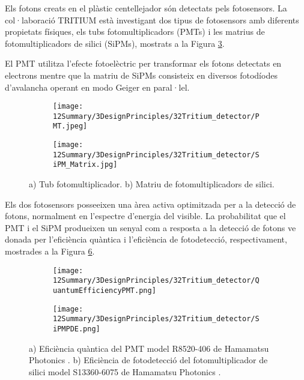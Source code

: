 Els fotons creats en el plàstic centellejador són detectats pels fotosensors. La col·laboració TRITIUM està investigant dos tipus de fotosensors amb diferents propietats físiques, els tubs fotomultiplicadors (PMTs) i les matrius de fotomultiplicadors de silici (SiPMs), mostrats a la Figura \ref{fig:Fotosensors}.

El PMT utilitza l'efecte fotoelèctric per transformar els fotons detectats en electrons mentre que la matriu de SiPMs consisteix en diversos fotodíodes d'avalancha operant en modo Geiger en paral·lel.

\begin{figure}[htpb]
\centering
    \begin{subfigure}[b]{0.4\textwidth}
    \centering
    \texttt{[image: 12Summary/3DesignPrinciples/32Tritium\_detector/PMT.jpeg]}  
    \caption{\label{subfig:PMT}}
    \end{subfigure}
    \hfill
    \begin{subfigure}[b]{0.4\textwidth}
    \centering
    \texttt{[image: 12Summary/3DesignPrinciples/32Tritium\_detector/SiPM\_Matrix.jpg]}  
    \caption{\label{subfig:SiPM}}
    \end{subfigure}
 \caption{a) Tub fotomultiplicador. b) Matriu de fotomultiplicadors de silici.}
 \label{fig:Fotosensors}
\end{figure}

Els dos fotosensors posseeixen una àrea activa optimitzada per a la detecció de fotons, normalment en l'espectre d'energia del visible. La probabilitat que el PMT i el SiPM produeixen un senyal com a resposta a la detecció de fotons ve donada per l'eficiència quàntica i l'eficiència de fotodetecció, respectivament, mostrades a la Figura \ref{fig:EficienciaFotosensors}. 

\begin{figure}[htpb]
\centering
    \begin{subfigure}[b]{0.75\textwidth}
    \centering
    \texttt{[image: 12Summary/3DesignPrinciples/32Tritium\_detector/QuantumEfficiencyPMT.png]}  
    \caption{\label{subfig:QEPMT}}
    \end{subfigure}
    \hfill
    \begin{subfigure}[b]{0.75\textwidth}
    \centering
    \texttt{[image: 12Summary/3DesignPrinciples/32Tritium\_detector/SiPMPDE.png]}  
    \caption{\label{subfig:PDESiPM}}
    \end{subfigure}
 \caption{a) Eficiència quàntica del PMT model R8520-406 de Hamamatsu Photonics \cite{DataSheetPMTs}. b) Eficiència de fotodetecció del fotomultiplicador de silici model S13360-6075 de Hamamatsu Photonics \cite{DataSheetHammamatsu_1_SiPM_1375}.}
 \label{fig:EficienciaFotosensors}
\end{figure}

